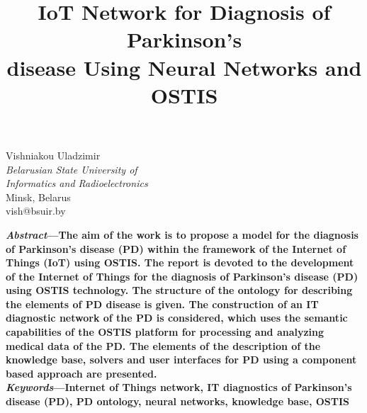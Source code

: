\documentclass[a4paper,10pt,twocolumn]{article}
\title{\textbf{IoT Network for Diagnosis of Parkinson’s\\
disease Using Neural Networks and OSTIS}}
\date{}
\begin{document}
\maketitle
\begin{center}
    Vishniakou Uladzimir\\
\textit{Belarusian State University of\\
Informatics and Radioelectronics}\\
Minsk, Belarus\\
vish@bsuir.by
\end{center}

\textbf{\textit{Abstract}—The aim of the work is to propose a model
for the diagnosis of Parkinson’s disease (PD) within the
framework of the Internet of Things (IoT) using OSTIS.
The report is devoted to the development of the Internet
of Things for the diagnosis of Parkinson’s disease (PD)
using OSTIS technology. The structure of the ontology
for describing the elements of PD disease is given. The
construction of an IT diagnostic network of the PD is
considered, which uses the semantic capabilities of the
OSTIS platform for processing and analyzing medical data
of the PD. The elements of the description of the knowledge
base, solvers and user interfaces for PD using a component based approach are presented.\\ \vspace{0mm} \textit{Keywords}—Internet of Things network, IT diagnostics of Parkinson’s disease (PD), PD ontology, neural networks,
knowledge base, OSTIS}
\end{document}
